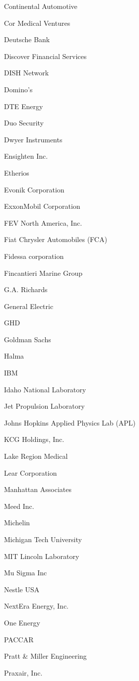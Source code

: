 \documentclass[twoside]{article}
\begin{document}
\begin{center}
\begin{multicols}{5}
\begin{FlushLeft}
\begin{compactitem}
\item Continental Automotive
\item Cor Medical Ventures
\item Deutsche Bank
\item Discover Financial Services
\item DISH Network
\item Domino's
\item DTE Energy
\item Duo Security
\item Dwyer Instruments
\item Ensighten Inc.
\item Etherios
\item Evonik Corporation
\item ExxonMobil Corporation
\item FEV North America, Inc.
\item Fiat Chrysler Automobiles (FCA)
\item Fidessa corporation
\item Fincantieri Marine Group
\item G.A. Richards
\item General Electric
\item GHD
\item Goldman Sachs
\item Halma
\item IBM
\item Idaho National Laboratory
\item Jet Propulsion Laboratory
\item Johns Hopkins Applied Physics Lab (APL)
\item KCG Holdings, Inc.
\item Lake Region Medical
\item Lear Corporation
\item Manhattan Associates
\item Meed Inc.
\item Michelin
\item Michigan Tech University
\item MIT Lincoln Laboratory
\item Mu Sigma Inc
\item Nestle USA
\item NextEra Energy, Inc.
\item One Energy
\item PACCAR
\item Pratt \& Miller Engineering
\item Praxair, Inc.

\end{compactitem}
\end{FlushLeft}
\end{multicols}
\end{center}
\end{document}
